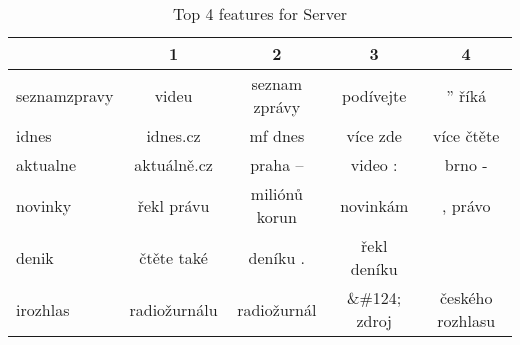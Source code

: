 \begin{table}
\centering
\caption{Top 4 features for Server}
\label{tab:top4_server}
\begin{tabular}{lcccc}
\toprule
{} &             1 &              2 &             3 &                 4 \\
\midrule
seznamzpravy &         videu &  seznam zprávy &     podívejte &            ” říká \\
idnes        &      idnes.cz &        mf dnes &      více zde &        více čtěte \\
aktualne     &   aktuálně.cz &        praha – &       video : &            brno - \\
novinky      &    řekl právu &  miliónů korun &      novinkám &           , právo \\
denik        &    čtěte také &       deníku . &   řekl deníku &                 ­ \\
irozhlas     &  radiožurnálu &    radiožurnál &  \&\#124; zdroj &  českého rozhlasu \\
\bottomrule
\end{tabular}
\end{table}
